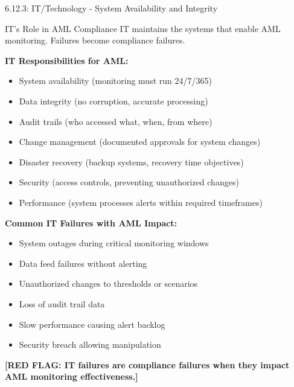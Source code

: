 \documentclass[11pt,a4paper]{beamer}
\newcommand{\redflag}[1]{\textcolor{red!80!black}{\textbf{[RED FLAG: #1]}}}
\begin{document}
\begin{frame}{6.12.3: IT/Technology - System Availability and Integrity}
	\begin{block}{IT's Role in AML Compliance}
		IT maintains the systems that enable AML monitoring. Failures become compliance failures.
	\end{block}
	\textbf{IT Responsibilities for AML:}
	\begin{itemize}
		\item System availability (monitoring must run 24/7/365)
		\item Data integrity (no corruption, accurate processing)
		\item Audit trails (who accessed what, when, from where)
		\item Change management (documented approvals for system changes)
		\item Disaster recovery (backup systems, recovery time objectives)
		\item Security (access controls, preventing unauthorized changes)
		\item Performance (system processes alerts within required timeframes)
	\end{itemize}
	\textbf{Common IT Failures with AML Impact:}
	\begin{itemize}
		\item System outages during critical monitoring windows
		\item Data feed failures without alerting
		\item Unauthorized changes to thresholds or scenarios
		\item Loss of audit trail data
		\item Slow performance causing alert backlog
		\item Security breach allowing manipulation
	\end{itemize}
	\redflag{IT failures are compliance failures when they impact AML monitoring effectiveness.}
\end{frame}

\end{document}
